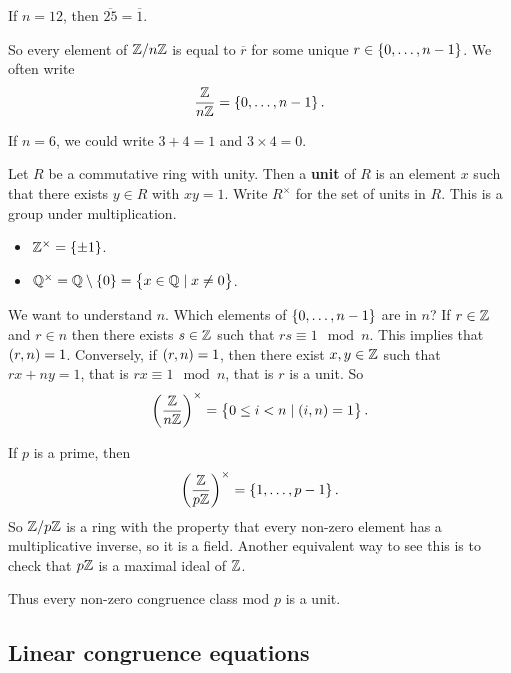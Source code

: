 \begin{example*}
If $ n = 12 $, then $ \overline{25} = \overline{1} $.
\end{example*}

So every element of $ \mathbb{Z} / n\mathbb{Z} $ is equal to $ \overline{r} $ for some unique $ r \in \cbr{0, \dots, n - 1} $. We often write
$$ \dfrac{\Z}{n\Z} = \cbr{0, \dots, n - 1}. $$

\begin{example*}
If $ n = 6 $, we could write $ 3 + 4 = 1 $ and $ 3 \times 4 = 0 $.
\end{example*}

Let $ R $ be a commutative ring with unity. Then a \textbf{unit} of $ R $ is an element $ x $ such that there exists $ y \in R $ with $ xy = 1 $. Write $ R^\times $ for the set of units in $ R $. This is a group under multiplication.

\begin{example*}
\hfill
\begin{itemize}
\item $ \Z^\times = \cbr{\pm 1} $.
\item $ \Q^\times = \Q \setminus \cbr{0} = \cbr{x \in \Q \mid x \ne 0} $.
\end{itemize}
\end{example*}

We want to understand $ \unit{n} $. Which elements of $ \cbr{0, \dots, n - 1} $ are in $ \unit{n} $? If $ r \in \mathbb{Z} $ and $ r \in \unit{n} $ then there exists $ s \in \mathbb{Z} $ such that $ rs \equiv 1 \mod n $. This implies that $ \br{r, n} = 1 $. Conversely, if $ \br{r, n} = 1 $, then there exist $ x, y \in \mathbb{Z} $ such that $ rx + ny = 1 $, that is $ rx \equiv 1 \mod n $, that is $ r $ is a unit. So
$$ \Unit{n} = \cbr{0 \le i < n \mid \br{i, n} = 1}. $$

\begin{example*}
If $ p $ is a prime, then
$$ \Unit{p} = \cbr{1, \dots, p - 1}. $$
So $ \mathbb{Z} / p\mathbb{Z} $ is a ring with the property that every non-zero element has a multiplicative inverse, so it is a field. Another equivalent way to see this is to check that $ p\mathbb{Z} $ is a maximal ideal of $ \mathbb{Z} $.
\end{example*}

Thus every non-zero congruence class mod $ p $ is a unit.

\pagebreak

\subsection{Linear congruence equations}


